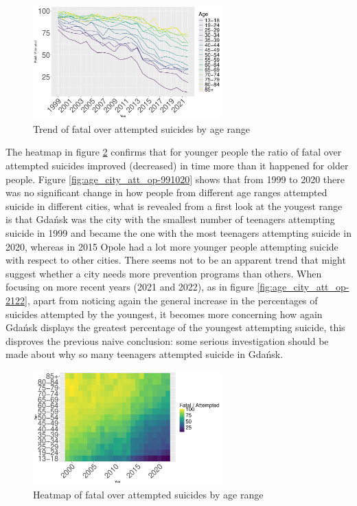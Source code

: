 \documentclass{article}
\begin{document}
\begin{figure}[H]
    \centering
    \includegraphics[width=0.65\textwidth]{imgs/age_foa.pdf}
    \caption{Trend of fatal over attempted suicides by age range}
    \label{fig:age_foa}
\end{figure}
%
The heatmap in figure \ref{fig:age_foa_heat} confirms that for younger people the ratio of fatal over 
attempted suicides improved (decreased) in time more than it happened for older people.
Figure \ref{fig:age_city_att_op-991020} shows that from 1999 to 2020 there was no significant 
change in how people from different age ranges attempted suicide in different cities,
what is revealed from a first look at the yougest range is that Gdańsk was the city with the
smallest number of teenagers attempting suicide in 1999 and became the one with the most
teenagers attempting suicide in 2020, whereas in 2015 Opole had a lot more younger people
attempting suicide with respect to other cities. 
There seems not to be an apparent trend that might suggest 
whether a city needs more prevention programs than others.
When focusing on more recent years (2021 and 2022), as in figure \ref{fig:age_city_att_op-2122},
apart from noticing again the general increase in the percentages of suicides attempted by
the youngest, it becomes more concerning how again Gdańsk displays
the greatest percentage of the youngest attempting suicide, this disproves
the previous naive conclusion: some serious investigation should be made
about why so many teenagers attempted suicide in Gdańsk.
% 
%
\begin{figure}[H]
    \centering
    \includegraphics[width=0.65\textwidth]{imgs/age_foa_heat.pdf}
    \caption{Heatmap of fatal over attempted suicides by age range}
    \label{fig:age_foa_heat}
\end{figure}
\end{document}
